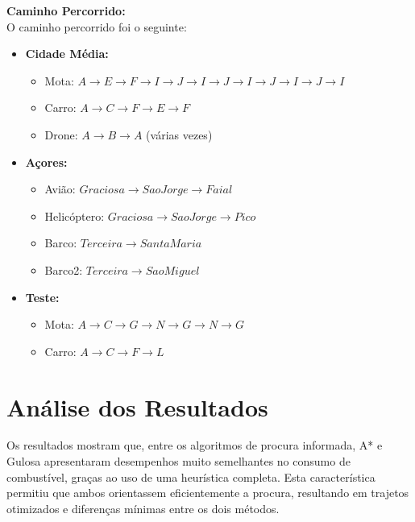 \documentclass[a4paper,12pt]{scrreprt}
\begin{document}
\textbf{Caminho Percorrido:} \\
O caminho percorrido foi o seguinte:
\begin{itemize}
    \item \textbf{Cidade Média:}
        \begin{itemize}
            \item Mota: $A \rightarrow E \rightarrow F \rightarrow I \rightarrow J \rightarrow I
             \rightarrow J \rightarrow I \rightarrow J \rightarrow I \rightarrow J \rightarrow I$ \\
            \item Carro: $A \rightarrow C \rightarrow F \rightarrow E \rightarrow F$ \\
            \item Drone: $A \rightarrow B \rightarrow A$ (várias vezes)
        \end{itemize}
    \item \textbf{Açores:}
        \begin{itemize}
            \item Avião: $Graciosa \rightarrow Sao Jorge \rightarrow Faial$ \\
            \item Helicóptero: $Graciosa \rightarrow Sao Jorge \rightarrow Pico$ \\
            \item Barco: $Terceira \rightarrow Santa Maria$ \\
            \item Barco2: $Terceira \rightarrow Sao Miguel$
        \end{itemize}
    \item \textbf{Teste:}
        \begin{itemize}
            \item Mota: $A \rightarrow C \rightarrow G \rightarrow N \rightarrow G
            \rightarrow N \rightarrow G$ \\
            \item Carro: $A \rightarrow C \rightarrow F \rightarrow L$
        \end{itemize}
\end{itemize}

\clearpage

\section{Análise dos Resultados}

Os resultados mostram que, entre os algoritmos de procura informada, A* e Gulosa apresentaram desempenhos muito semelhantes no consumo de combustível, graças ao uso de uma heurística completa. Esta característica permitiu que ambos orientassem eficientemente a procura, resultando em trajetos otimizados e diferenças mínimas entre os dois métodos.
\end{document}
